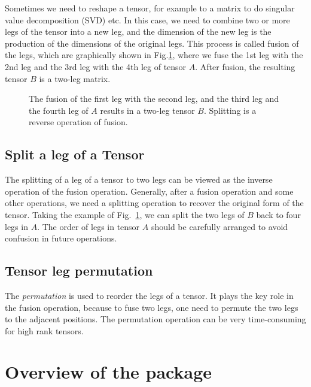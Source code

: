 \documentclass[preprint,3p,times,preprint,showpacs,amsmath,superscriptaddress,floatfix]{elsarticle}
\begin{document}
Sometimes we need to reshape a tensor, for example to a matrix to do singular value decomposition (SVD) etc. In this case, we need to combine
two or more legs of the tensor into a new leg, and the dimension of the new leg is the production of the dimensions of the original legs.
This process is called fusion of the legs, which are graphically shown in Fig.\ref{fuse}, where we fuse the 1st leg with the 2nd leg and the 3rd leg with the 4th leg of tensor $A$. After fusion,
the resulting tensor $B$ is a two-leg matrix.
%
\begin{figure} [!hbp]
		\begin{center}
		\caption{The fusion of the first leg with the second leg, and the third leg and the fourth leg of $A$ results in a two-leg tensor $B$. Splitting is a reverse operation of fusion.}\label{fuse}
		\end{center}
\end{figure}

\subsection{Split a leg of a Tensor}

The splitting of a leg of a tensor to two legs can be viewed as the inverse operation of the fusion operation. Generally, after a fusion operation and some other operations, we need a splitting operation to recover the original form of the tensor. Taking the example of Fig.~\ref{fuse},
we can split the two legs of $B$ back to four legs  in $A$. The order of legs in tensor $A$ should be carefully arranged to avoid confusion in future operations.


\subsection{Tensor leg permutation}

The {\it permutation} is used to reorder the legs of a tensor. It plays the key role in the fusion operation, because to fuse two legs, one need to permute the two legs to the adjacent positions.
The permutation operation can be very time-consuming for high rank tensors.


\section{Overview of the package}
\label{sec:overview}
\end{document}
